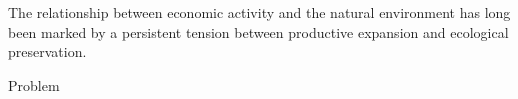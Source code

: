 
The relationship between economic activity and the natural environment has long been marked by a persistent tension between productive expansion and ecological preservation.

Problem

